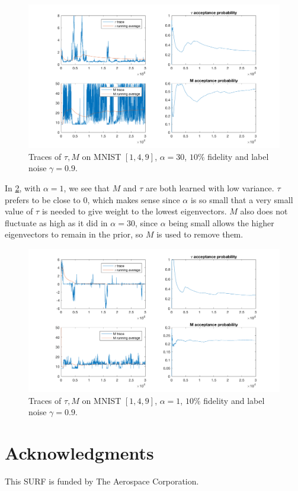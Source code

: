 \documentclass{siamart1116}
\begin{document}
        \begin{figure}[!htb]
        \centering
        \caption{\label{tM_mnist_1}Traces of $\tau, M$ on MNIST $[1, 4, 9]$, $\alpha = 30$, $10\%$ fidelity and label noise $\gamma = 0.9$.}
        \includegraphics[width=0.8\linewidth]{choose_hyp/t_M/alpha=30.png}
        \end{figure}

        In \cref{tM_mnist_2}, with $\alpha=1$, we see that $M$ and $\tau$ are both learned with low variance. $\tau$ prefers to be close to $0$, which makes sense since $\alpha$ is so small that a very small value of $\tau$ is needed to give weight to the lowest eigenvectors. $M$ also does not fluctuate as high as it did in $\alpha=30$, since $\alpha$ being small allows the higher eigenvectors to remain in the prior, so $M$ is used to remove them.

        \begin{figure}[!htb]
        \centering
        \caption{\label{tM_mnist_2}Traces of $\tau, M$ on MNIST $[1, 4, 9]$, $\alpha = 1$, $10\%$ fidelity and label noise $\gamma = 0.9$.}
        \includegraphics[width=0.8\linewidth]{choose_hyp/t_M/alpha=1.png}
        \end{figure}

\section{Acknowledgments}
    This SURF is funded by The Aerospace Corporation.



\end{document}
